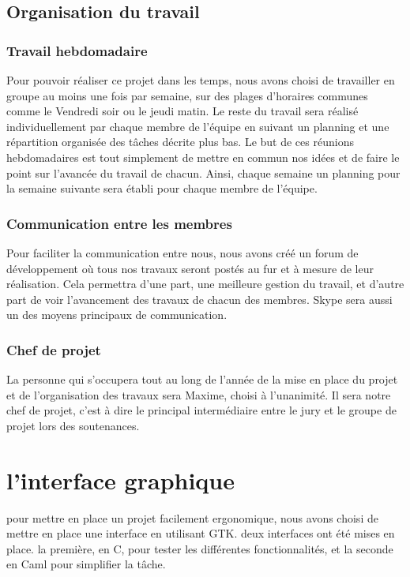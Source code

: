 \documentclass[12pt]{report}
\begin{document}
\section{Organisation du travail} %
		\subsection{Travail hebdomadaire}

Pour pouvoir réaliser ce projet dans les temps, nous avons choisi de travailler en groupe au moins une fois par semaine, sur des plages d'horaires communes comme le Vendredi soir ou le jeudi matin. Le reste du travail sera réalisé individuellement par chaque membre de l'équipe en suivant un planning et une répartition organisée des tâches décrite plus bas. Le but de ces réunions hebdomadaires est tout simplement de mettre en commun nos idées et de faire le point sur l'avancée du travail de chacun. Ainsi, chaque semaine un planning pour la semaine suivante sera établi pour chaque membre de l'équipe.

		\subsection{Communication entre les membres} %

Pour faciliter la communication entre nous, nous avons créé un forum de développement
o\`u tous nos travaux seront postés au fur et \`a  mesure de leur réalisation. Cela permettra d'une part, une meilleure gestion du travail, et d'autre part de voir l'avancement des travaux de chacun des membres. Skype sera aussi un des moyens principaux de communication.

		\subsection{Chef de projet}

La personne qui s'occupera tout au long de l'année de la mise en place du projet
et de l'organisation des travaux sera Maxime, choisi à l'unanimité. Il sera notre chef de projet, c'est à dire le principal intermédiaire entre le jury et le groupe de projet lors des soutenances.

\chapter{l'interface graphique}
pour mettre en place un projet facilement ergonomique, nous avons choisi de mettre en place une interface en utilisant GTK. deux interfaces ont été mises en place. la première, en C, pour tester les différentes fonctionnalités, et la seconde en Caml pour simplifier la tâche.
\end{document}
